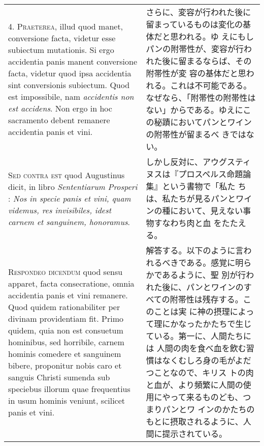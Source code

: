 \documentclass[10pt]{jsarticle} %
\begin{document}
\begin{longtable}{p{21em}p{21em}}
\\



4. {\scshape Praeterea}, illud quod manet, conversione facta, videtur
esse subiectum mutationis. Si ergo accidentia panis manent conversione
facta, videtur quod ipsa accidentia sint conversionis subiectum. Quod
est impossibile, nam {\itshape accidentis non est accidens}. Non ergo
in hoc sacramento debent remanere accidentia panis et vini.

&

さらに、変容が行われた後に留まっているものは変化の基体だと思われる。ゆ
えにもしパンの附帯性が、変容が行われた後に留まるならば、その附帯性が変
容の基体だと思われる。これは不可能である。なぜなら、「附帯性の附帯性は
ない」からである。ゆえにこの秘蹟においてパンとワインの附帯性が留まるべ
きではない。



\\



{\scshape Sed contra est} quod Augustinus dicit, in libro {\itshape
Sententiarum Prosperi} : {\itshape Nos in specie panis et vini, quam
videmus, res invisibiles, idest carnem et sanguinem, honoramus}.

&

しかし反対に、アウグスティヌスは『プロスペルス命題論集』という書物で「私た
ちは、私たちが見るパンとワインの種において、見えない事物すなわち肉と血
をたたえる。

\\



{\scshape Respondeo dicendum} quod sensu apparet, facta consecratione,
omnia accidentia panis et vini remanere. Quod quidem rationabiliter
per divinam providentiam fit. Primo quidem, quia non est consuetum
hominibus, sed horribile, carnem hominis comedere et sanguinem bibere,
proponitur nobis caro et sanguis Christi sumenda sub speciebus illorum
quae frequentius in usum hominis veniunt, scilicet panis et vini.


&

解答する。以下のように言われるべきである。感覚に明らかであるように、聖
別が行われた後に、パンとワインのすべての附帯性は残存する。このことは実
に神の摂理によって理にかなったかたちで生じている。第一に、人間たちには
人間の肉を食べ血を飲む習慣はなくむしろ身の毛がよだつことなので、キリス
トの肉と血が、より頻繁に人間の使用にやって来るものども、つまりパンとワ
インのかたちのもとに摂取されるように、人間に提示されている。


\end{longtable}
\end{document}
